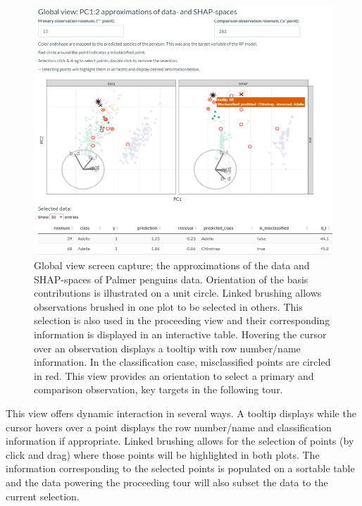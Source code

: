 \documentclass[
]{article}
\begin{document}
\begin{figure}

{\centering \includegraphics[width=1\linewidth]{./figures/global_view_penguins} 

}

\caption{Global view screen capture; the approximations of the data and SHAP-spaces of Palmer penguins data. Orientation of the basis contributions is illustrated on a unit circle. Linked brushing allows observations brushed in one plot to be selected in others. This selection is also used in the proceeding view and their corresponding information is displayed in an interactive table. Hovering the cursor over an observation displays a tooltip with row number/name information. In the classification case, misclassified points are circled in red. This view provides an orientation to select a primary and comparison observation, key targets in the following tour.}\label{fig:globalview}
\end{figure}

This view offers dynamic interaction in several ways. A tooltip displays while the cursor hovers over a point displays the row number/name and classification information if appropriate. Linked brushing allows for the selection of points (by click and drag) where those points will be highlighted in both plots. The information corresponding to the selected points is populated on a sortable table and the data powering the proceeding tour will also subset the data to the current selection.
\end{document}
